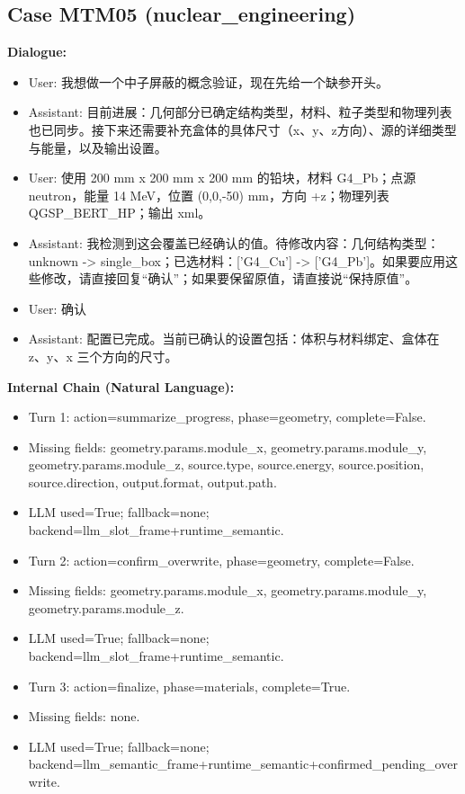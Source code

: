 \documentclass[11pt]{ctexart}
\begin{document}
\subsection{Case MTM05 (nuclear\_engineering)}
\textbf{Dialogue:}
\begin{itemize}
\item User: 我想做一个中子屏蔽的概念验证，现在先给一个缺参开头。
\item Assistant: 目前进展：几何部分已确定结构类型，材料、粒子类型和物理列表也已同步。接下来还需要补充盒体的具体尺寸（x、y、z方向）、源的详细类型与能量，以及输出设置。
\item User: 使用 200 mm x 200 mm x 200 mm 的铅块，材料 G4\_Pb；点源 neutron，能量 14 MeV，位置 (0,0,-50) mm，方向 +z；物理列表 QGSP\_BERT\_HP；输出 xml。
\item Assistant: 我检测到这会覆盖已经确认的值。待修改内容：几何结构类型：unknown -> single\_box；已选材料：['G4\_Cu'] -> ['G4\_Pb']。如果要应用这些修改，请直接回复“确认”；如果要保留原值，请直接说“保持原值”。
\item User: 确认
\item Assistant: 配置已完成。当前已确认的设置包括：体积与材料绑定、盒体在 z、y、x 三个方向的尺寸。
\end{itemize}
\textbf{Internal Chain (Natural Language):}
\begin{itemize}
\item Turn 1: action=summarize\_progress, phase=geometry, complete=False.
\item Missing fields: geometry.params.module\_x, geometry.params.module\_y, geometry.params.module\_z, source.type, source.energy, source.position, source.direction, output.format, output.path.
\item LLM used=True; fallback=none; backend=llm\_slot\_frame+runtime\_semantic.
\item Turn 2: action=confirm\_overwrite, phase=geometry, complete=False.
\item Missing fields: geometry.params.module\_x, geometry.params.module\_y, geometry.params.module\_z.
\item LLM used=True; fallback=none; backend=llm\_slot\_frame+runtime\_semantic.
\item Turn 3: action=finalize, phase=materials, complete=True.
\item Missing fields: none.
\item LLM used=True; fallback=none; backend=llm\_semantic\_frame+runtime\_semantic+confirmed\_pending\_overwrite.
\end{itemize}
\end{document}
